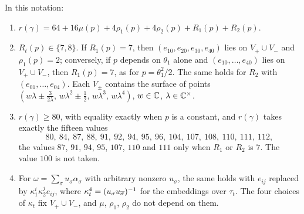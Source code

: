 \begin{theorem}
\label{thm:quarticrank}
In this notation:
\begin{enumerate}[label=\textup{(\roman*)},leftmargin=2.6em,itemsep=2pt]
\item $r(\gamma)=64+16\mu(p)+4\rho_{1}(p)+4\rho_{2}(p)+R_{1}(p)+R_{2}(p)$.
\item $R_{t}(p)\in\{7,8\}$. If $R_{1}(p)=7$, then
  $(e_{10},e_{20},e_{30},e_{40})$ lies on $V_{+}\cup V_{-}$ and
  $\rho_{1}(p)=2$; conversely, if $p$ depends on $\theta_{1}$ alone and
  $(e_{10},\dots,e_{40})$ lies on $V_{+}\cup V_{-}$, then $R_{1}(p)=7$, as for
  $p=\theta_{1}^{2}/2$. The same holds for $R_{2}$ with
  $(e_{01},\dots,e_{04})$. Each $V_{\pm}$ contains the surface of points
  $(w\lambda\pm\frac{3}{2\lambda},\,w\lambda^{2}\pm\frac12,\,w\lambda^{3},
  \,w\lambda^{4})$, $w\in\mathbb{C}$, $\lambda\in\mathbb{C}^{\times}$.
\item $r(\gamma)\ge80$, with equality exactly when $p$ is a constant, and
  $r(\gamma)$ takes exactly the fifteen values
  \[
    80,\ 84,\ 87,\ 88,\ 91,\ 92,\ 94,\ 95,\ 96,\ 104,\ 107,\ 108,\ 110,\ 111,\
    112 ,
  \]
  the values $87$, $91$, $94$, $95$, $107$, $110$ and $111$ only when $R_{1}$
  or $R_{2}$ is $7$. The value $100$ is not taken.
\item For $\omega=\sum_{\sigma}u_{\sigma}\alpha_{\sigma}$ with arbitrary
  nonzero $u_{\sigma}$, the same holds with $e_{ij}$ replaced by
  $\kappa_{1}^{i}\kappa_{2}^{j}e_{ij}$, where $\kappa_{t}^{4}=
  (u_{\sigma}u_{\overline{\sigma}})^{-1}$ for the embeddings over $\tau_{t}$. The
  four choices of $\kappa_{t}$ fix $V_{+}\cup V_{-}$, and $\mu$, $\rho_{1}$,
  $\rho_{2}$ do not depend on them.
\end{enumerate}
\end{theorem}

